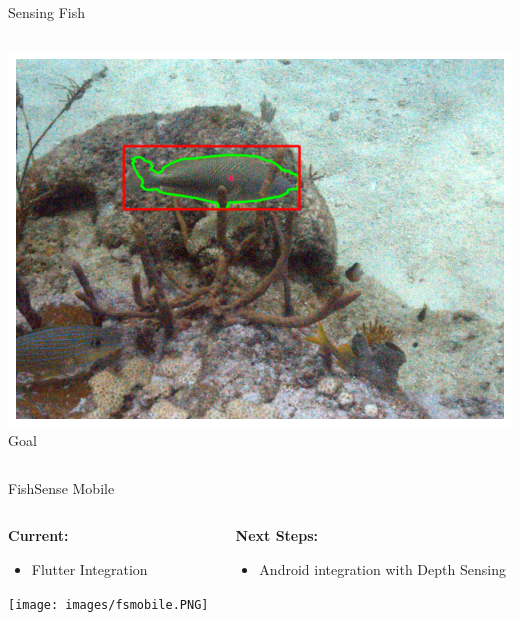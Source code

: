 \begin{frame}{Sensing Fish}
\begin{columns}
\begin{column}{0.33\textwidth}
            \includegraphics[width=\linewidth,keepaspectratio]{images/ideal.png}
            {\small Goal}
        \end{column}
    \end{columns}
\end{frame}

\begin{frame}{FishSense Mobile}
    \begin{columns}[T] %
        \begin{column}{0.45\textwidth}
            \textbf{Current:}
            \begin{itemize}
                \item Flutter Integration
            \end{itemize}
            \vspace{0.5em}
            \centering
            \texttt{[image: images/fsmobile.PNG]}
        \end{column}
        \begin{column}{0.5\textwidth}
            \textbf{Next Steps:}
            \begin{itemize}
                \item Android integration with Depth Sensing
            \end{itemize}
        \end{column}
    \end{columns}
\end{frame}

